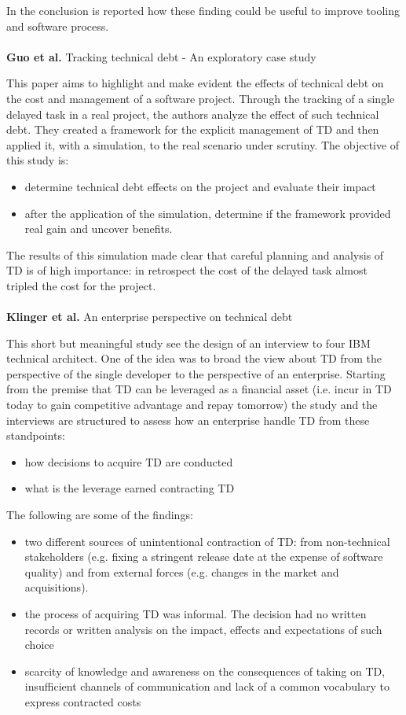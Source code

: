 In the conclusion is reported how these finding could be useful to improve tooling and software process.
\\
\\
\textbf{Guo et al.} \cite{guo2011tracking} Tracking technical debt - An exploratory case study

This paper aims to highlight and make evident the effects of technical debt on the cost and management of a software project. Through the tracking of a single delayed task in a real project, the authors analyze the effect of such technical debt. They created a framework for the explicit management of TD and then applied it, with a simulation, to the real scenario under scrutiny.
The objective of this study is:
\begin{itemize}
    \item determine technical debt effects on the project and evaluate their impact
    \item after the application of the simulation, determine if the framework provided real gain and uncover benefits.
\end{itemize}
The results of this simulation made clear that careful planning and analysis of TD is of high importance: in retrospect the cost of the delayed task almost tripled the cost for the project.
\\
\\
\textbf{Klinger et al.} \cite{klinger2011enterprise} An enterprise perspective on technical debt

This short but meaningful study see the design of an interview to four IBM technical architect. One of the idea was to broad the view about TD from the perspective of the single developer to the perspective of an enterprise.
Starting from the premise that TD can be leveraged as a financial asset (i.e. incur in TD today to gain competitive advantage and repay tomorrow) the study and the interviews are structured to assess how an enterprise handle TD from these standpoints:
\begin{itemize}
    \item how decisions to acquire TD are conducted
    \item what is the leverage earned contracting TD
\end{itemize}
The following are some of the findings:
\begin{itemize}
    \item two different sources of unintentional contraction of TD: from non-technical stakeholders (e.g. fixing a stringent release date at the expense of software quality) and from external forces (e.g. changes in the market and acquisitions).
    \item the process of acquiring TD was informal. The decision had no written records or written analysis on the impact, effects and expectations of such choice
    \item scarcity of knowledge and awareness on the consequences of taking on TD, insufficient channels of communication and lack of a common vocabulary to express contracted costs 
\end{itemize}
\\

